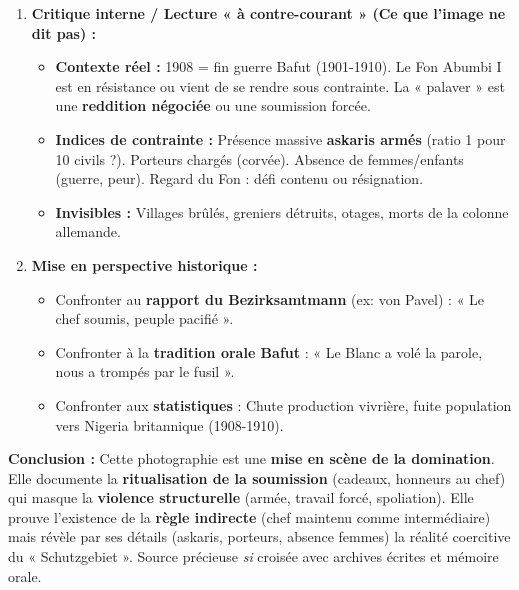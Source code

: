 \documentclass[11pt]{article}
\begin{document}
\begin{exoresolu}
\begin{enumerate}
\begin{itemize}
        \item \textbf{Message visé :} \textbf{« Règle indirecte harmonieuse ».} L'Allemagne respecte les « chefs naturels » (pagne, plumes). Collaboration élites locales. Ordre (askaris alignés). Modernité (chaise, carnet, uniforme) encadrant Tradition.
        \item \textbf{Cible :} Opinion publique allemande (cartes postales, rapports coloniaux), chefs rivaux (montrer soumission), administration centrale (Berlin) : « Pacification réussie ».
    \end{itemize}
    \item \textbf{Critique interne / Lecture « à contre-courant » (Ce que l'image ne dit pas) :}
    \begin{itemize}
        \item \textbf{Contexte réel :} 1908 = fin guerre Bafut (1901-1910). Le Fon Abumbi I est en résistance ou vient de se rendre sous contrainte. La « palaver » est une \textbf{reddition négociée} ou une soumission forcée.
        \item \textbf{Indices de contrainte :} Présence massive \textbf{askaris armés} (ratio 1 pour 10 civils ?). Porteurs chargés (corvée). Absence de femmes/enfants (guerre, peur). Regard du Fon : défi contenu ou résignation.
        \item \textbf{Invisibles :} Villages brûlés, greniers détruits, otages, morts de la colonne allemande.
    \end{itemize}
    \item \textbf{Mise en perspective historique :}
    \begin{itemize}
        \item Confronter au \textbf{rapport du Bezirksamtmann} (ex: von Pavel) : « Le chef soumis, peuple pacifié ».
        \item Confronter à la \textbf{tradition orale Bafut} : « Le Blanc a volé la parole, nous a trompés par le fusil ».
        \item Confronter aux \textbf{statistiques} : Chute production vivrière, fuite population vers Nigeria britannique (1908-1910).
    \end{itemize}
\end{enumerate}
\textbf{Conclusion :} Cette photographie est une \textbf{mise en scène de la domination}. Elle documente la \textbf{ritualisation de la soumission} (cadeaux, honneurs au chef) qui masque la \textbf{violence structurelle} (armée, travail forcé, spoliation). Elle prouve l'existence de la \textbf{règle indirecte} (chef maintenu comme intermédiaire) mais révèle par ses détails (askaris, porteurs, absence femmes) la réalité coercitive du « Schutzgebiet ». Source précieuse \emph{si} croisée avec archives écrites et mémoire orale.
\end{exoresolu}
\end{document}
